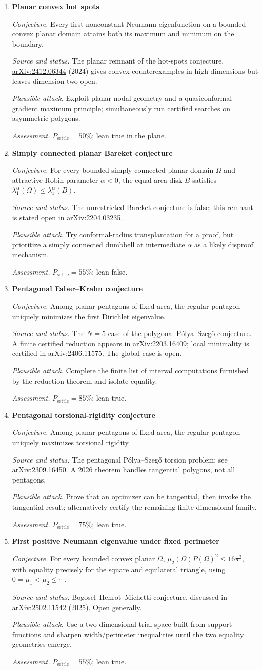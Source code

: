 \documentclass[11pt]{article}
\newcommand{\cand}[5]{%
  \item \textbf{#1}\par
  \emph{Conjecture.} #2\par
  \emph{Source and status.} #3\par
  \emph{Plausible attack.} #4\par
  \emph{Assessment.} #5
}
\newcommand{\psettle}{P_{\mathrm{settle}}}
\begin{document}
\begin{enumerate}[label=\textbf{M\arabic*.}]
\cand{Planar convex hot spots}
{Every first nonconstant Neumann eigenfunction on a bounded convex planar domain attains both its maximum and minimum on the boundary.}
{The planar remnant of the hot-spots conjecture.  \href{https://arxiv.org/abs/2412.06344}{arXiv:2412.06344} (2024) gives convex counterexamples in high dimensions but leaves dimension two open.}
{Exploit planar nodal geometry and a quasiconformal gradient maximum principle; simultaneously run certified searches on asymmetric polygons.}
{$\psettle=50\%$; lean true in the plane.}

\cand{Simply connected planar Bareket conjecture}
{For every bounded simply connected planar domain $\Omega$ and attractive Robin parameter $\alpha<0$, the equal-area disk $B$ satisfies $\lambda_1^\alpha(\Omega)\le\lambda_1^\alpha(B)$.}
{The unrestricted Bareket conjecture is false; this remnant is stated open in \href{https://arxiv.org/abs/2204.03235}{arXiv:2204.03235}.}
{Try conformal-radius transplantation for a proof, but prioritize a simply connected dumbbell at intermediate $\alpha$ as a likely disproof mechanism.}
{$\psettle=55\%$; lean false.}

\cand{Pentagonal Faber--Krahn conjecture}
{Among planar pentagons of fixed area, the regular pentagon uniquely minimizes the first Dirichlet eigenvalue.}
{The $N=5$ case of the polygonal P\'olya--Szeg\H{o} conjecture.  A finite certified reduction appears in \href{https://arxiv.org/abs/2203.16409}{arXiv:2203.16409}; local minimality is certified in \href{https://arxiv.org/abs/2406.11575}{arXiv:2406.11575}.  The global case is open.}
{Complete the finite list of interval computations furnished by the reduction theorem and isolate equality.}
{$\psettle=85\%$; lean true.}

\cand{Pentagonal torsional-rigidity conjecture}
{Among planar pentagons of fixed area, the regular pentagon uniquely maximizes torsional rigidity.}
{The pentagonal P\'olya--Szeg\H{o} torsion problem; see \href{https://arxiv.org/abs/2309.16450}{arXiv:2309.16450}.  A 2026 theorem handles tangential polygons, not all pentagons.}
{Prove that an optimizer can be tangential, then invoke the tangential result; alternatively certify the remaining finite-dimensional family.}
{$\psettle=75\%$; lean true.}

\cand{First positive Neumann eigenvalue under fixed perimeter}
{For every bounded convex planar $\Omega$, $\mu_2(\Omega)P(\Omega)^2\le16\pi^2$, with equality precisely for the square and equilateral triangle, using $0=\mu_1<\mu_2\le\cdots$.}
{Bogosel--Henrot--Michetti conjecture, discussed in \href{https://arxiv.org/abs/2502.11542}{arXiv:2502.11542} (2025).  Open generally.}
{Use a two-dimensional trial space built from support functions and sharpen width/perimeter inequalities until the two equality geometries emerge.}
{$\psettle=55\%$; lean true.}


\end{enumerate}
\end{document}
